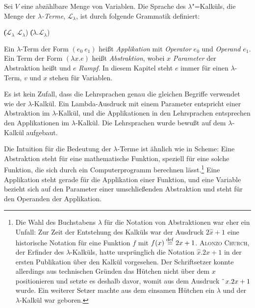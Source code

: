 \begin{definition}
  
  Sei $V$ eine abzählbare Menge von Variablen. 
  Die Sprache des $\lambda$"=Kalküls, die Menge der
  \textit{$\lambda$-Terme},
  $\mathcal{L}_{\lambda}$, ist
  durch folgende Grammatik definiert:
  \begin{grammar}
     \: 
    \> \| ($\mathcal{L}_{\lambda}$ $\mathcal{L}_{\lambda}$)
    \> \| ($\lambda$.$\mathcal{L}_{\lambda}$)
  \end{grammar}
%
Ein $\lambda$-Term der Form $(e_0~e_1)$ heißt 
\textit{Applikation} mit \textit{Operator} $e_0$ und \textit{Operand}
$e_1$.  Ein Term der Form $(\lambda x.e)$ heißt \textit{Abstraktion},
wobei $x$ \textit{Parameter} der Abstraktion heißt und $e$
\textit{Rumpf}.  In diesem Kapitel steht $e$ immer für
einen $\lambda$-Term, $v$ und $x$ stehen für Variablen.
\end{definition}
%
Es ist kein Zufall, dass die Lehrsprachen genau die gleichen Begriffe verwendet
wie der $\lambda$-Kalkül.  Ein Lambda-Ausdruck mit einem
Parameter entspricht einer Abstraktion im $\lambda$-Kalkül,
und die Applikationen in den Lehrsprachen entsprechen den Applikationen im
$\lambda$-Kalkül.  Die Lehrsprachen wurde bewußt auf dem
$\lambda$-Kalkül aufgebaut.

Die Intuition für die Bedeutung der $\lambda$-Terme ist ähnlich wie in
Scheme: Eine Abstraktion steht für eine mathematische Funktion,
speziell für eine solche Funktion, die sich durch ein Computerprogramm
berechnen lässt.\footnote{Die Wahl des Buchstabens $\lambda$ für die
  Notation von Abstraktionen war eher ein Unfall: Zur Zeit der
  Entstehung des Kalküls war der Ausdruck $2\hat{x}+1$ eine historische Notation für eine
  Funktion $f$ mit $f(x)\stackrel{\rm def}{=}{}2x+1$.  \textsc{Alonzo Church},
  der Erfinder des $\lambda$-Kalküls, hatte ursprünglich
  die Notation $\hat{x}.2x+1$ in der ersten Publikation über den
  Kalkül vorgesehen.  Der Schriftsetzer konnte allerdings aus
  technischen Gründen
  das Hütchen nicht über dem $x$ positionieren und setzte es deshalb
  davor, womit aus dem Ausdruck $\hat{~}\thinspace{}x.2x+1$ wurde.  Ein weiterer
  Setzer machte aus dem einsamen Hütchen ein $\lambda$ und der
  $\lambda$-Kalkül war geboren.}  Eine Applikation steht gerade für
die Applikation einer Funktion, und eine Variable bezieht sich auf den
Parameter einer umschließenden Abstraktion und steht für den Operanden
der Applikation.

